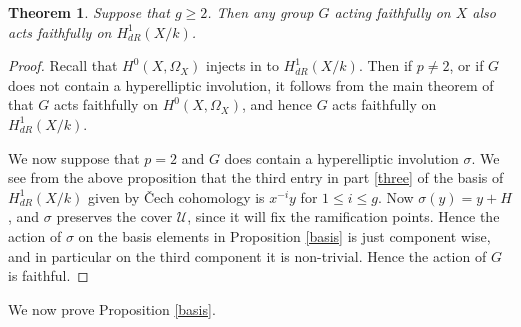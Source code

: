 \documentclass[draft, 11pt]{article} %
\theoremstyle{plain}
\newtheorem{thm}[defn]{Theorem}
\theoremstyle{remark}
\newcommand{\cech}{\v{C}ech }
\begin{document}
\begin{thm}

Suppose that $g \geq 2$.
Then any group $G$ acting faithfully on $X$ also acts faithfully on $H^1_{dR}(X/k)$.

\end{thm}
\begin{proof}

Recall that $H^0(X,\Omega_X)$ injects in to $H^1_{dR}(X/k)$.
Then if $p \neq 2$, or if $G$ does not contain a hyperelliptic involution, it follows from the main theorem of \cite{faithfulaction} that $G$ acts faithfully on $H^0(X,\Omega_X)$, and hence $G$ acts faithfully on $H^1_{dR}(X/k)$.

We now suppose that $p=2$ and $G$ does contain a hyperelliptic involution $\sigma$.
We see from the above proposition that the third entry in part \eqref{three} of the basis of $H^1_{dR}(X/k)$ given by \cech cohomology is $x^{-i}y$ for $1 \leq i \leq g$.
Now $\sigma(y) = y+ H$, and $\sigma$ preserves the cover $\mathcal U$, since it will fix the ramification points.
Hence the action of $\sigma$ on the basis elements in Proposition \ref{basis} is just component wise, and in particular on the third component it is non-trivial.
Hence the action of $G$ is faithful.


\end{proof}


We now prove Proposition \ref{basis}.
\end{document}
